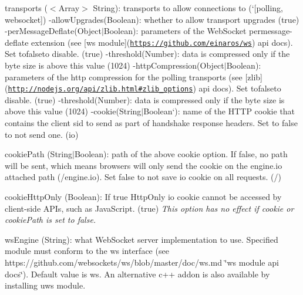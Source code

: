 \begin{DoxyItemize}
\begin{DoxyItemize}
\begin{DoxyItemize}
\item {\ttfamily transports} ({\ttfamily $<$Array$>$ String})\+: transports to allow connections to (`\mbox{[}\textquotesingle{}polling\textquotesingle{}, \textquotesingle{}websocket\textquotesingle{}\mbox{]}{\ttfamily ) -\/}allow\+Upgrades{\ttfamily (}Boolean{\ttfamily )\+: whether to allow transport upgrades (}true{\ttfamily ) -\/}per\+Message\+Deflate{\ttfamily (}Object$\vert$\+Boolean{\ttfamily )\+: parameters of the Web\+Socket permessage-\/deflate extension (see \mbox{[}ws module\mbox{]}(\href{https://github.com/einaros/ws}{\tt https\+://github.\+com/einaros/ws}) api docs). Set to}false{\ttfamily to disable. (}true{\ttfamily ) -\/}threshold{\ttfamily (}Number{\ttfamily )\+: data is compressed only if the byte size is above this value (}1024{\ttfamily ) -\/}http\+Compression{\ttfamily (}Object$\vert$\+Boolean{\ttfamily )\+: parameters of the http compression for the polling transports (see \mbox{[}zlib\mbox{]}(\href{http://nodejs.org/api/zlib.html#zlib_options}{\tt http\+://nodejs.\+org/api/zlib.\+html\#zlib\+\_\+options}) api docs). Set to}false{\ttfamily to disable. (}true{\ttfamily ) -\/}threshold{\ttfamily (}Number{\ttfamily )\+: data is compressed only if the byte size is above this value (}1024{\ttfamily ) -\/}cookie{\ttfamily (}String$\vert$\+Boolean`)\+: name of the H\+T\+TP cookie that contains the client sid to send as part of handshake response headers. Set to {\ttfamily false} to not send one. ({\ttfamily io})
\item {\ttfamily cookie\+Path} ({\ttfamily String$\vert$\+Boolean})\+: path of the above {\ttfamily cookie} option. If false, no path will be sent, which means browsers will only send the cookie on the engine.\+io attached path ({\ttfamily /engine.io}). Set false to not save io cookie on all requests. ({\ttfamily /})
\item {\ttfamily cookie\+Http\+Only} ({\ttfamily Boolean})\+: If {\ttfamily true} Http\+Only io cookie cannot be accessed by client-\/side A\+P\+Is, such as Java\+Script. ({\ttfamily true}) {\itshape This option has no effect if {\ttfamily cookie} or {\ttfamily cookie\+Path} is set to {\ttfamily false}.}
\item {\ttfamily ws\+Engine} ({\ttfamily String})\+: what Web\+Socket server implementation to use. Specified module must conform to the {\ttfamily ws} interface (see https\+://github.com/websockets/ws/blob/master/doc/ws.\+md \char`\"{}ws module api docs\char`\"{}). Default value is {\ttfamily ws}. An alternative c++ addon is also available by installing {\ttfamily uws} module.

\end{DoxyItemize}
\end{DoxyItemize}
\end{DoxyItemize}

